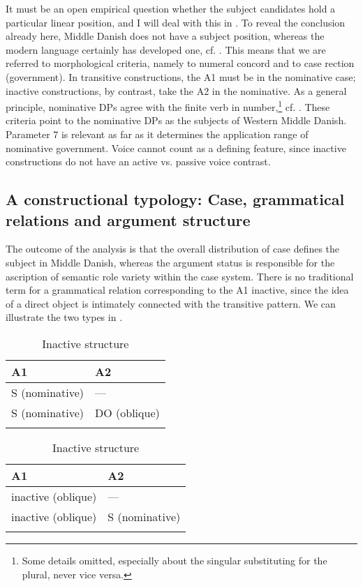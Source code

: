 \documentclass[output=paper]{langscibook}
\begin{document}
  It must be an open empirical question whether the subject candidates hold a particular linear position, and I will deal with this in . To reveal the conclusion already here, Middle Danish does not have a subject position, whereas the modern language certainly has developed one, cf. . This means that we are referred to morphological criteria, namely to numeral concord and to case rection (government). In transitive constructions, the A1 must be in the nominative case; inactive constructions, by contrast, take the A2 in the nominative. As a general principle, nominative DPs agree with the finite verb in number,\footnote{Some details omitted, especially about the singular substituting for the plural, never vice versa.} cf. . These criteria point to the nominative DPs as the subjects of Western Middle Danish. Parameter 7 is relevant as far as it determines the application range of nominative government. Voice cannot count as a defining feature, since inactive constructions do not have an active vs. passive voice contrast.

\subsection{A constructional typology: Case, grammatical relations and argument structure} \label{heltoft:3.3}

The outcome of the analysis is that the overall distribution of case defines the subject in Middle Danish, whereas the argument status is responsible for the ascription of semantic role variety within the case system. There is no traditional term for a grammatical relation corresponding to the A1 inactive, since the idea of a direct object is intimately connected with the transitive pattern. We can illustrate the two types in .

\begin{table}\small
\caption{Transitive and inactive constructional typology}
\label{tab:heltoft:5}
    \begin{subtable}[b]{.5\linewidth}\centering
        \caption{Transitive structure}
    \begin{tabular}{ll}
        \lsptoprule
        {A1} & {A2}\\\midrule
        {S} {(nominative)} & --- \\
        {S} {(nominative)} & {DO} {(oblique)}\\
        \lspbottomrule
    \end{tabular}
    \end{subtable}\begin{subtable}[b]{.5\linewidth}\centering
        \caption{Inactive structure}
    \begin{tabular}{ll}
        \lsptoprule
        {A1} & {A2}\\\midrule
        {inactive} {(oblique)} & --- \\
        {inactive} {(oblique)} & {S} {(nominative)}\\
        \lspbottomrule
    \end{tabular}
    \end{subtable}
\end{table}
\end{document}
